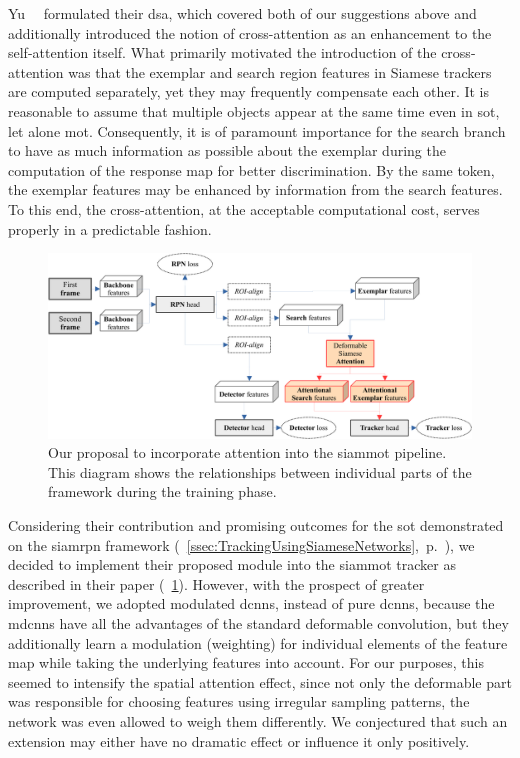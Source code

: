 Yu~\etal{}~\cite{yu2021dsa} formulated their \gls{dsa}, which covered both of our suggestions above and additionally introduced the notion of cross-attention as an enhancement to the self-attention itself. What primarily motivated the introduction of the cross-attention was that the exemplar and search region features in Siamese trackers are computed separately, yet they may frequently compensate each other. It is reasonable to assume that multiple objects appear at the same time even in \gls{sot}, let alone \gls{mot}. Consequently, it is of paramount importance for the search branch to have as much information as possible about the exemplar during the computation of the response map for better discrimination. By the same token, the exemplar features may be enhanced by information from the search features. To this end, the cross-attention, at the acceptable computational cost, serves properly in a predictable fashion.

\begin{figure}[t]
    \centerline{\includegraphics[width=\linewidth]{figures/siamese_tracking/siammot_attention_training.pdf}}
    \caption[\gls{siammot} with attention]{Our proposal to incorporate attention into the \gls{siammot} pipeline. This diagram shows the relationships between individual parts of the framework during the training phase.}
    \label{fig:SiamMOTWithAttention}
\end{figure}

Considering their contribution and promising outcomes for the \gls{sot} demonstrated on the \gls{siamrpn} framework (\sectiontext{}~\ref{ssec:TrackingUsingSiameseNetworks},~p.~\pageref{ssec:TrackingUsingSiameseNetworks}), we decided to implement their proposed module into the \gls{siammot} tracker as described in their paper (\figtext{}~\ref{fig:SiamMOTWithAttention}). However, with the prospect of greater improvement, we adopted modulated \glspl{dcnn}, instead of pure \glspl{dcnn}, because the \glspl{mdcnn} have all the advantages of the standard deformable convolution, but they additionally learn a modulation (weighting) for individual elements of the feature map while taking the underlying features into account. For our purposes, this seemed to intensify the spatial attention effect, since not only the deformable part was responsible for choosing features using irregular sampling patterns, the network was even allowed to weigh them differently. We conjectured that such an extension may either have no dramatic effect or influence it only positively.

